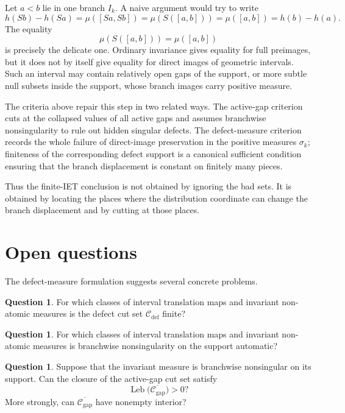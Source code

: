 \documentclass[11pt]{amsart}
\theoremstyle{plain}
\theoremstyle{definition}
\newtheorem{question}[theorem]{Question}
\theoremstyle{remark}
\DeclareMathOperator{\Leb}{Leb}
\newcommand{\cC}{\mathcal C}
\begin{document}
Let $a<b$ lie in one branch $I_k$. A naive argument would try to write
\[
        h(Sb)-h(Sa)=\mu([Sa,Sb])=\mu(S([a,b]))=\mu([a,b])=h(b)-h(a).
\]
The equality
\[
        \mu(S([a,b]))=\mu([a,b])
\]
is precisely the delicate one. Ordinary invariance gives equality for full preimages, but it does not by itself give equality for direct images of geometric intervals. Such an interval may contain relatively open gaps of the support, or more subtle null subsets inside the support, whose branch images carry positive measure.

The criteria above repair this step in two related ways. The active-gap criterion cuts at the collapsed values of all active gaps and assumes branchwise nonsingularity to rule out hidden singular defects. The defect-measure criterion records the whole failure of direct-image preservation in the positive measures $\sigma_k$; finiteness of the corresponding defect support is a canonical sufficient condition ensuring that the branch displacement is constant on finitely many pieces.

Thus the finite-IET conclusion is not obtained by ignoring the bad sets. It is obtained by locating the places where the distribution coordinate can change the branch displacement and by cutting at those places.

\section{Open questions}

The defect-measure formulation suggests several concrete problems.

\begin{question}
For which classes of interval translation maps and invariant non-atomic measures is the defect
cut set \(\cC_{\mathrm{def}}\) finite?
\end{question}

\begin{question}
For which classes of interval translation maps and invariant non-atomic measures is
branchwise nonsingularity on the support automatic?
\end{question}

\begin{question}
Suppose that the invariant measure is branchwise nonsingular on its support. Can the closure
of the active-gap cut set satisfy
\[
        \Leb\bigl(\overline{\cC_{\mathrm{gap}}}\bigr)>0?
\]
More strongly, can \(\overline{\cC_{\mathrm{gap}}}\) have nonempty interior?
\end{question}
\end{document}
